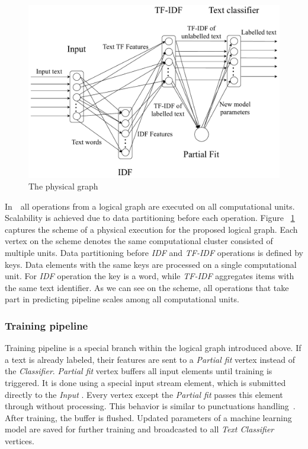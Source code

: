 \begin{figure}[htbp]
  \centering
  \includegraphics[scale=0.375]{pics/physical-graph}
  \caption{The physical graph}
  \label {physical_graph}
\end{figure}

In~\FlameStream\, all operations from a logical graph are executed on all computational units. Scalability is achieved due to data partitioning before each operation. Figure ~\ref{physical_graph} captures the scheme of a physical execution for the proposed logical graph. Each vertex on the scheme denotes the same computational cluster consisted of multiple units. Data partitioning before {\em IDF} and {\em TF-IDF} operations is defined by keys. Data elements with the same keys are processed on a single computational unit. For {\em IDF} operation the key is a word, while {\em TF-IDF} aggregates items with the same text identifier. As we can see on the scheme, all operations that take part in predicting pipeline scales among all computational units. 

\subsubsection{Training pipeline}

Training pipeline is a special branch within the logical graph introduced above. If a text is already labeled, their features are sent to a {\em Partial fit} vertex instead of the {\em Classifier}. {\em Partial fit} vertex buffers all input elements until training is triggered. It is done using a special input stream element, which is submitted directly to the {\em Input} . Every vertex except the {\em Partial fit} passes this element through without processing. This behavior is similar to punctuations handling~\cite{tucker2003exploiting}. After training, the buffer is flushed. Updated parameters of a machine learning model are saved for further training and broadcasted to all {\em Text Classifier} vertices.

